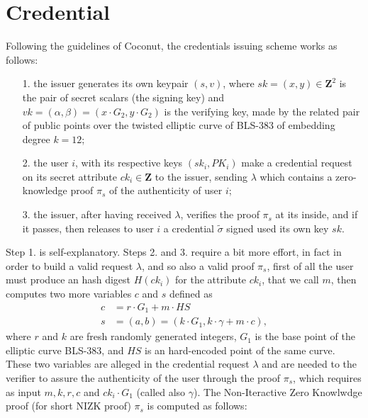 \documentclass{article}
\begin{document}
\section{Credential}
\label{sec:credential}

Following the guidelines of Coconut, the credentials issuing scheme works as follows:
\begin{itemize}
\item [1.] the issuer generates its own keypair $(s,v)$, where $sk=(x,y)\in\mathbf{Z}^2$ is the pair of secret scalars (the signing key) and $vk=(\alpha, \beta)=(x\cdot G_2,y\cdot G_2)$ is the verifying key, made by the related pair of public points over the twisted elliptic curve of BLS-383 of embedding degree $k=12$; 
\item [2.] the user $i$, with its respective keys $(sk_i, PK_i)$ make a credential request on its secret attribute $ck_i\in\mathbf{Z}$ to the issuer, sending $\lambda$ which contains a zero-knowledge proof $\pi_s$ of the authenticity of user $i$; 
\item[3.] the issuer, after having received $\lambda$, verifies the proof $\pi_s$ at its inside, and if it passes, then releases to user $i$ a credential $\tilde{\sigma}$ signed used its own key $sk$.
\end{itemize}
Step 1. is self-explanatory. Steps 2. and 3. require a bit more effort, in fact in order to build a valid request $\lambda$, and so also a valid proof $\pi_s$, first of all the user must produce an hash digest $H(ck_i)$ for the attribute $ck_i$, that we call $m$, then computes two more variables $c$ and $s$ defined as
\begin{align*}
c &= r\cdot G_1 + m\cdot HS \\
s &= (a,b) = (k \cdot G_1, k\cdot \gamma + m\cdot c),
\end{align*}
where $r$ and $k$ are fresh randomly generated integers, $G_1$ is the base point of the elliptic curve BLS-383, and $HS$ is an hard-encoded point of the same curve. These two variables are alleged in the credential request $\lambda$ and are needed to the verifier to assure the authenticity of the user through the proof $\pi_s$, which requires as input $m, k, r, c$ and $ck_i\cdot G_1$ (called also $\gamma$). The Non-Iteractive Zero Knowlwdge proof (for short NIZK proof) $\pi_s$ is computed as follows:
\end{document}
